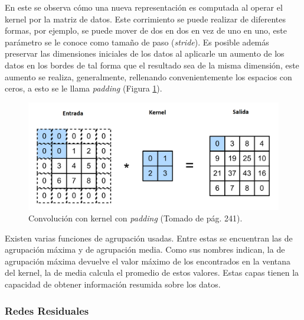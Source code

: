 En este se observa cómo una nueva representación es computada al operar el kernel por la matriz de datos. Este
corrimiento se puede realizar de diferentes formas, por ejemplo, se puede mover de dos en dos en vez de uno en uno, este
parámetro se le conoce como tamaño de paso (\emph{stride}). Es posible además preservar las dimensiones
iniciales de los datos al aplicarle un aumento de los datos en los bordes de tal forma que el resultado sea de la misma
dimensión, este aumento se realiza, generalmente, rellenando convenientemente los espacios con ceros, 
a esto se le llama \emph{padding} (Figura \ref{fig:conv_kernel_padding}).

\begin{figure}[h!]
	\begin{center}
		\begin{center}
			\includegraphics[scale=.2]{Graphics/kernel_convolution_padding.png}
        \end{center}
		\caption{Convolución con kernel con \emph{padding} (Tomado de \textcite{d2l} pág. 241).}\label{fig:conv_kernel_padding}
	\end{center}
\end{figure}

Existen varias funciones de agrupación usadas. Entre estas se encuentran las de agrupación máxima y de 
agrupación media. Como sus nombres indican, la de agrupación máxima devuelve el valor máximo de los encontrados
en la ventana del kernel, la de media calcula el promedio de estos valores. Estas capas tienen la capacidad de obtener
información resumida sobre los datos.

\subsubsection{Redes Residuales}

